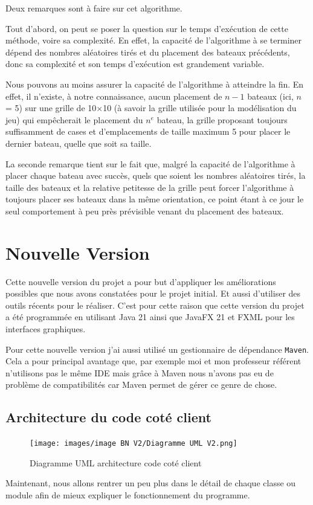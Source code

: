 \documentclass[12pt]{article}
\begin{document}
Deux remarques sont à faire sur cet algorithme.

\bigskip

Tout d'abord, on peut se poser la question sur le temps d'exécution de cette
méthode, voire sa complexité. En effet, la capacité de l'algorithme à se
terminer dépend des nombres aléatoires tirés et du placement des bateaux
précédents, donc sa complexité et son temps d'exécution est grandement
variable.

\bigskip

Nous pouvons au moins assurer la capacité de l'algorithme à atteindre la fin.
En effet, il n'existe, à notre connaissance, aucun placement de $n-1$ bateaux
(ici, $n$ = 5) sur une grille de 10$\times$10 (à savoir la grille utilisée pour
la
modélisation du jeu) qui empêcherait le placement du $n^e$ bateau, la grille
proposant toujours suffisamment de cases et d'emplacements de taille maximum 5
pour placer le dernier bateau, quelle que soit sa taille.

\bigskip

La seconde remarque tient sur le fait que, malgré la capacité de l'algorithme à
placer chaque bateau avec succès, quels que soient les nombres aléatoires
tirés, la taille des bateaux et la relative petitesse de la grille peut forcer
l'algorithme à toujours placer ses bateaux dans la même orientation, ce point
étant à ce jour le seul comportement à peu près prévisible venant du placement
des bateaux.

\newpage

\section{Nouvelle Version}

Cette nouvelle version du projet a pour but d'appliquer les améliorations
possibles que nous avons constatées pour le projet initial. Et aussi d'utiliser
des outils récents pour le réaliser. C'est pour cette raison que cette version
du projet a été programmée en utilisant Java 21 ainsi que JavaFX 21 et FXML
pour les interfaces graphiques.

Pour cette nouvelle version j'ai aussi utilisé un gestionnaire de dépendance
\texttt{Maven}. Cela a pour principal avantage que, par exemple moi et mon
professeur référent n'utilisons pas le même IDE mais grâce à Maven nous n'avons
pas eu de problème de compatibilités car Maven permet de gérer ce genre de
chose.

\bigskip

\subsection{Architecture du code coté client}
\begin{figure}[H]
      \centering
      \texttt{[image: images/image BN V2/Diagramme UML
            V2.png]}
      \caption{Diagramme UML architecture code coté client}
\end{figure}
\bigskip
Maintenant, nous allons rentrer un peu plus dans le détail de chaque classe ou
module afin de mieux expliquer le fonctionnement du programme.
\end{document}
